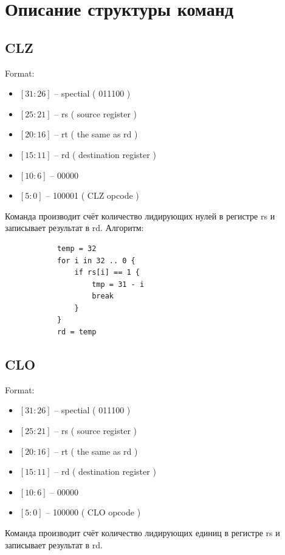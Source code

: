 \documentclass[a4paper, 10pt]{article}
\begin{document}
    \section*{Описание структуры команд}
        \subsection*{CLZ}
            Format:
            \begin{itemize}
                \item $[31:26]$  -- spectial ( 011100 )
                \item $[25:21]$  -- rs ( source register )
                \item $[20:16]$  -- rt ( the same as rd )
                \item $[15:11]$  -- rd ( destination register )
                \item $[10:6]$   -- 00000
                \item $[5:0]$    -- 100001 ( CLZ opcode )
            \end{itemize}
        Команда производит счёт количество лидирующих нулей в регистре rs и
        записывает результат в rd.
        Алгоритм:
        \begin{verbatim}
            temp = 32
            for i in 32 .. 0 {
                if rs[i] == 1 {
                    tmp = 31 - i
                    break
                }
            }
            rd = temp
        \end{verbatim}
        \subsection*{CLO}
            Format:
            \begin{itemize}
                \item $[31:26]$ -- spectial ( 011100 )
                \item $[25:21]$ -- rs ( source register )
                \item $[20:16]$ -- rt ( the same as rd )
                \item $[15:11]$ -- rd ( destination register )
                \item $[10:6]$  -- 00000
                \item $[5:0]$   -- 100000 ( CLO opcode )
            \end{itemize}
        Команда производит счёт количество лидирующих единиц в регистре rs и
        записывает результат в rd.
\end{document}
